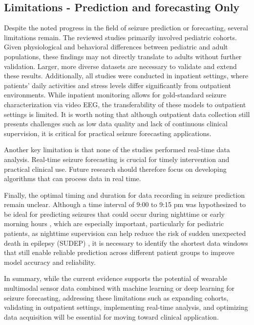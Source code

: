 \subsection{Limitations - Prediction and forecasting Only}
Despite the noted progress in the field of seizure prediction or forecasting, several limitations remain. The reviewed studies primarily involved pediatric cohorts. Given physiological and behavioral differences between pediatric and adult populations, these findings may not directly translate to adults without further validation. Larger, more diverse datasets are necessary to validate and extend these results. Additionally, all studies were conducted in inpatient settings, where patients’ daily activities and stress levels differ significantly from outpatient environments. While inpatient monitoring allows for gold-standard seizure characterization via video EEG, the transferability of these models to outpatient settings is limited. It is worth noting that although outpatient data collection still presents challenges such as low data quality and lack of continuous clinical supervision, it is critical for practical seizure forecasting applications.

Another key limitation is that none of the studies performed real-time data analysis. Real-time seizure forecasting is crucial for timely intervention and practical clinical use. Future research should therefore focus on developing algorithms that can process data in real time.

Finally, the optimal timing and duration for data recording in seizure prediction remain unclear. Although a time interval of 9:00 to 9:15 pm was hypothesized to be ideal for predicting seizures  that could occur during nighttime or early morning hours \cite{Vieluf2023-zv}, which are especially important, particularly for pediatric patients, as nighttime supervision can help reduce the risk of sudden unexpected death in epilepsy (SUDEP) \cite{Trivisano2022-zw}, it is necessary to identify the shortest data windows that still enable reliable prediction across different patient groups to improve model accuracy and reliability.

In summary, while the current evidence supports the potential of wearable multimodal sensor data combined with machine learning or deep learning for seizure forecasting, addressing these limitations such as expanding cohorts, validating in outpatient settings, implementing real-time analysis, and optimizing data acquisition will be essential for moving toward clinical application.

